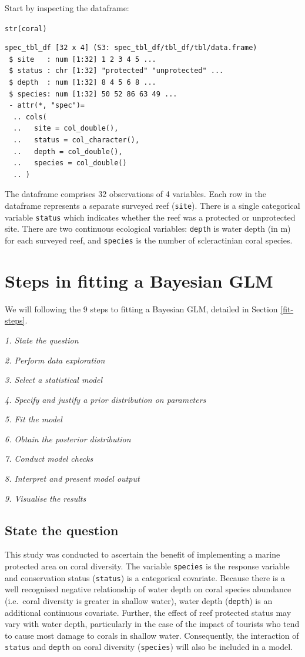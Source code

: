 \documentclass[
]{book}
\begin{document}
Start by inspecting the dataframe:

\texttt{str(coral)}

\begin{verbatim}
spec_tbl_df [32 x 4] (S3: spec_tbl_df/tbl_df/tbl/data.frame)
 $ site   : num [1:32] 1 2 3 4 5 ...
 $ status : chr [1:32] "protected" "unprotected" ...
 $ depth  : num [1:32] 8 4 5 6 8 ...
 $ species: num [1:32] 50 52 86 63 49 ...
 - attr(*, "spec")=
  .. cols(
  ..   site = col_double(),
  ..   status = col_character(),
  ..   depth = col_double(),
  ..   species = col_double()
  .. )
\end{verbatim}

The dataframe comprises 32 observations of 4 variables. Each row in the dataframe represents a separate surveyed reef (\texttt{site}). There is a single categorical variable \texttt{status} which indicates whether the reef was a protected or unprotected site. There are two continuous ecological variables: \texttt{depth} is water depth (in m) for each surveyed reef, and \texttt{species} is the number of scleractinian coral species.

\hypertarget{nb-glm-steps}{%
\section{Steps in fitting a Bayesian GLM}\label{nb-glm-steps}}

We will following the 9 steps to fitting a Bayesian GLM, detailed in Section \ref{fit-steps}.

\emph{1. State the question}

\emph{2. Perform data exploration}

\emph{3. Select a statistical model}

\emph{4. Specify and justify a prior distribution on parameters}

\emph{5. Fit the model}

\emph{6. Obtain the posterior distribution}

\emph{7. Conduct model checks}

\emph{8. Interpret and present model output}

\emph{9. Visualise the results}

\hypertarget{coral-question}{%
\subsection{State the question}\label{coral-question}}

This study was conducted to ascertain the benefit of implementing a marine protected area on coral diversity. The variable \texttt{species} is the response variable and conservation status (\texttt{status}) is a categorical covariate. Because there is a well recognised negative relationship of water depth on coral species abundance (i.e.~coral diversity is greater in shallow water), water depth (\texttt{depth}) is an additional continuous covariate. Further, the effect of reef protected status may vary with water depth, particularly in the case of the impact of tourists who tend to cause most damage to corals in shallow water. Consequently, the interaction of \texttt{status} and \texttt{depth} on coral diversity (\texttt{species}) will also be included in a model.
\end{document}
